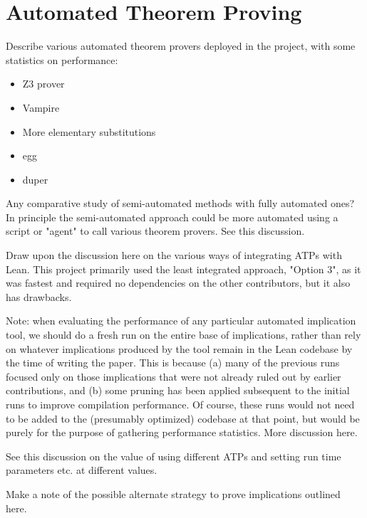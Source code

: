 
\section{Automated Theorem Proving}


Describe various automated theorem provers deployed in the project, with some statistics on performance:

\begin{itemize}
    \item Z3 prover
    \item Vampire
    \item More elementary substitutions
    \item egg
    \item duper
\end{itemize}

Any comparative study of semi-automated methods with fully automated ones? In principle the semi-automated approach could be more automated using a script or "agent" to call various theorem provers. See this discussion.

Draw upon the discussion here on the various ways of integrating ATPs with Lean. This project primarily used the least integrated approach, "Option 3", as it was fastest and required no dependencies on the other contributors, but it also has drawbacks.

Note: when evaluating the performance of any particular automated implication tool, we should do a fresh run on the entire base of implications, rather than rely on whatever implications produced by the tool remain in the Lean codebase by the time of writing the paper. This is because (a) many of the previous runs focused only on those implications that were not already ruled out by earlier contributions, and (b) some pruning has been applied subsequent to the initial runs to improve compilation performance. Of course, these runs would not need to be added to the (presumably optimized) codebase at that point, but would be purely for the purpose of gathering performance statistics. More discussion here.

See this discussion on the value of using different ATPs and setting run time parameters etc. at different values.

Make a note of the possible alternate strategy to prove implications outlined here.
